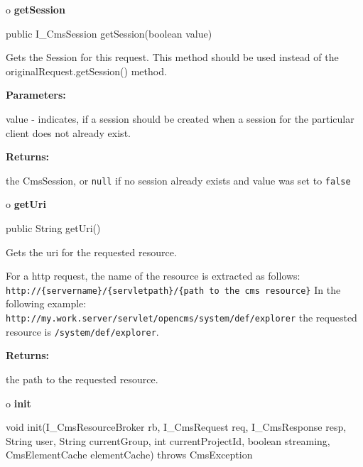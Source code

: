 o {\bf getSession} 

\begin{PRE}
 public I\_CmsSession getSession(boolean value)
\end{PRE}

\begin{description}
\htmlDD Gets the Session for this request. \htmlBR
This method should be used instead of the originalRequest.getSession() method.


\begin{description}
\item {\bf Parameters:}  

value - indicates, if a session should be created when a session for the
particular client does not already exist.  
\item {\bf Returns:}  

the CmsSession, or {\tt null} if no session already exists and value was set
to {\tt false}  
\end{description}

\end{description}

o {\bf getUri} 

\begin{PRE}
 public String getUri()
\end{PRE}

\begin{description}
\htmlDD Gets the uri for the requested resource. 

For a http request, the name of the resource is extracted as follows:\htmlBR
{\tt http://\{servername\}/\{servletpath\}/\{path to the cms
resource\}}\htmlBR
In the following example:\htmlBR
{\tt http://my.work.server/servlet/opencms/system/def/explorer}\htmlBR
the requested resource is {\tt /system/def/explorer}. 

\begin{description}
\item {\bf Returns:}  

the path to the requested resource.  
\end{description}

\end{description}

o {\bf init} 

\begin{PRE}
 void init(I\_CmsResourceBroker rb,
           I\_CmsRequest req,
           I\_CmsResponse resp,
           String user,
           String currentGroup,
           int currentProjectId,
           boolean streaming,
           CmsElementCache elementCache) throws CmsException
\end{PRE}

